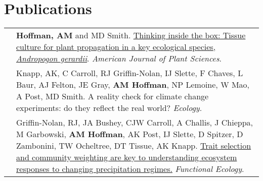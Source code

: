 \documentclass[letterpaper]{deedy-resume} %
\begin{document}

\section{Publications}
\begin{tabular}{>{\raggedleft\arraybackslash}p{2cm}p{16cm}}

2018 & \textbf{Hoffman, AM} and MD Smith. \href{https://www.scirp.org/Journal/PaperInformation.aspx?PaperID=87129}{Thinking inside the box: Tissue culture for plant propagation in a key ecological species, \textit{Andropogon gerardii}}. \textcolor{special}{\textit{American Journal of Plant Sciences}}.\\

2018 & Knapp, AK, C Carroll, RJ Griffin-Nolan, IJ Slette, F Chaves, L Baur, AJ Felton, JE Gray, \textbf{AM Hoffman}, NP Lemoine, W Mao, A Post, MD Smith. A reality check for climate change experiments: do they reflect the real world? \textcolor{special}{\textit{Ecology}}. \\

2018 & Griffin-Nolan, RJ, JA Bushey, CJW Carroll, A Challis, J Chieppa, M Garbowski, \textbf{AM Hoffman}, AK Post, IJ Slette, D Spitzer, D Zambonini, TW Ocheltree, DT Tissue, AK Knapp. \href{https://besjournals.onlinelibrary.wiley.com/doi/abs/10.1111/1365-2435.13135}{Trait selection and community weighting are key to understanding ecosystem responses to changing precipitation regimes.} \textcolor{special}{\textit{Functional Ecology}}.\\

\end{tabular}
\end{document}
